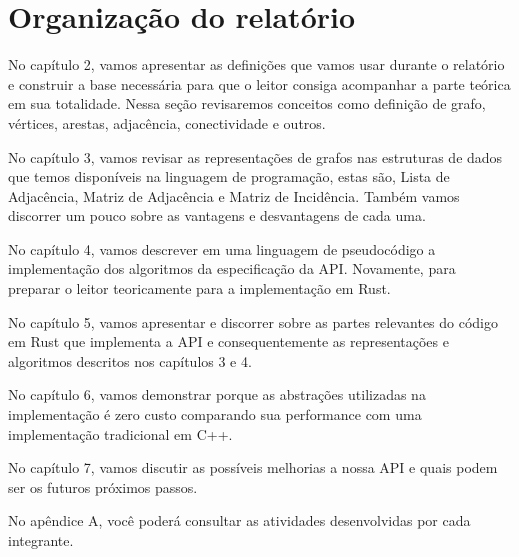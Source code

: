\section{Organização do relatório}

No capítulo 2, vamos apresentar as definições que vamos usar durante
o relatório e construir a base necessária para que o leitor consiga
acompanhar a parte teórica em sua totalidade. Nessa seção revisaremos conceitos
como definição de grafo, vértices, arestas, adjacência,
conectividade e outros.

No capítulo 3, vamos revisar as representações de grafos nas
estruturas de dados que temos disponíveis na linguagem de
programação, estas são, Lista de Adjacência, Matriz de Adjacência e
Matriz de Incidência. Também vamos discorrer um pouco sobre as
vantagens e desvantagens de cada uma.

No capítulo 4, vamos descrever em uma linguagem de pseudocódigo a
implementação dos algoritmos da especificação da API. Novamente, para
preparar o leitor teoricamente para a implementação em Rust.

No capítulo 5, vamos apresentar e discorrer sobre as partes relevantes
do código em Rust que implementa a API e consequentemente as representações e
algoritmos descritos nos capítulos 3 e 4.

No capítulo 6, vamos demonstrar porque as abstrações utilizadas na
implementação é zero custo comparando sua performance com uma
implementação tradicional em C++.

No capítulo 7, vamos discutir as possíveis melhorias a nossa API e quais
podem ser os futuros próximos passos.

No apêndice A, você poderá consultar as atividades desenvolvidas por
cada integrante.
